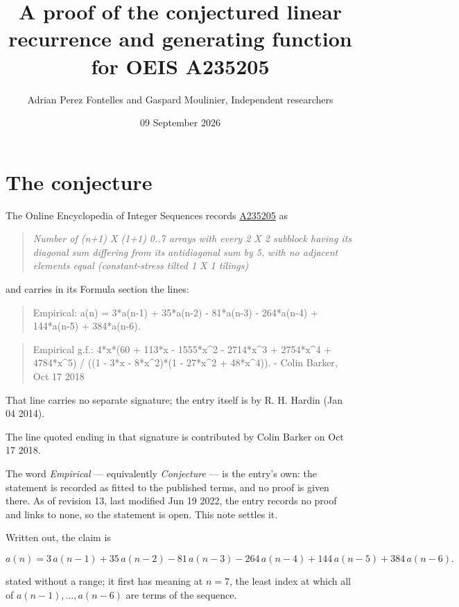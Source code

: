 \documentclass[11pt]{article}
\title{A proof of the conjectured linear recurrence and generating function for OEIS A235205}
\author{Adrian Perez Fontelles and Gaspard Moulinier, Independent researchers}
\date{09 September 2026}
\theoremstyle{definition}
\begin{document}
\maketitle
\section{The conjecture}

The Online Encyclopedia of Integer Sequences records \href{https://oeis.org/A235205}{A235205} as

\begin{quote}\itshape Number of (n+1) X (1+1) 0..7 arrays with every 2 X 2 subblock having its diagonal sum differing from its antidiagonal sum by 5, with no adjacent elements equal (constant-stress tilted 1 X 1 tilings)\end{quote}

and carries in its Formula section the lines:

\begin{quote}\ttfamily Empirical: a(n) = 3*a(n-1) + 35*a(n-2) - 81*a(n-3) - 264*a(n-4) + 144*a(n-5) + 384*a(n-6).\end{quote}

\begin{quote}\ttfamily Empirical g.f.: 4*x*(60 + 113*x - 1555*x\textasciicircum{}2 - 2714*x\textasciicircum{}3 + 2754*x\textasciicircum{}4 + 4784*x\textasciicircum{}5) / ((1 - 3*x - 8*x\textasciicircum{}2)*(1 - 27*x\textasciicircum{}2 + 48*x\textasciicircum{}4)). - Colin Barker, Oct 17 2018\end{quote}

That line carries no separate signature; the entry itself is by R. H. Hardin (Jan 04 2014).

The line quoted ending in that signature is contributed by Colin Barker on Oct 17 2018.

The word {\itshape Empirical} --- equivalently {\itshape Conjecture} --- is the entry's own: the statement is recorded as fitted to the published terms, and no proof is given there. As of revision 13, last modified Jun 19 2022, the entry records no proof and links to none, so the statement is open. This note settles it.

Written out, the claim is

\[a(n) = 3\,a(n-1) + 35\,a(n-2) - 81\,a(n-3) - 264\,a(n-4) + 144\,a(n-5) + 384\,a(n-6).\]

stated without a range; it first has meaning at $n = 7$, the least index at which all of $a(n-1),\dots,a(n-6)$ are terms of the sequence.
\end{document}
